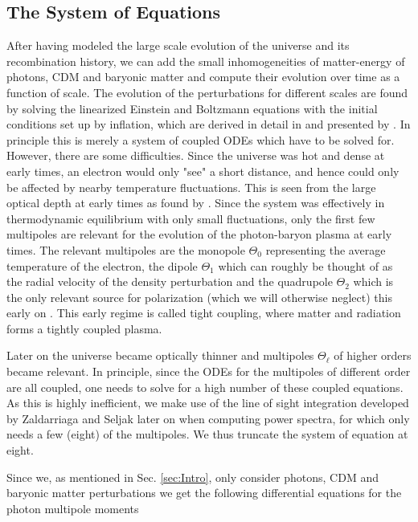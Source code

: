 \documentclass[twocolumn]{aastex62}
\begin{document}
\subsection{The System of Equations} \label{subsec:system}
After having modeled the large scale evolution of the universe and its recombination history, we can add the small inhomogeneities of matter-energy of photons, CDM and baryonic matter and compute their evolution over time as a function of scale. The evolution of the perturbations for different scales are found by solving the linearized Einstein and Boltzmann equations with the initial conditions set up by inflation, which are derived in detail in \cite{dodelson:2003} and presented by \cite{winther:2020b}. In principle this is merely a system of coupled ODEs which have to be solved for. However, there are some difficulties. Since the universe was hot and dense at early times, an electron would only "see" a short distance, and hence could only be affected by nearby temperature fluctuations. This is seen from the large optical depth at early times as found by \cite{stutzer:2020b}. Since the system was effectively in thermodynamic equilibrium with only small fluctuations, only the first few multipoles are relevant for the evolution of the photon-baryon plasma at early times. The relevant multipoles are the monopole $\Theta_0$ representing the average temperature of the electron, the dipole $\Theta_1$ which can roughly be thought of as the radial velocity of the density perturbation and the quadrupole $\Theta_2$ which is the only relevant source for polarization (which we will otherwise neglect) this early on \citep[]{winther:2020b}. This early regime is called tight coupling, where matter and radiation forms a tightly coupled plasma.

Later on the universe became optically thinner and multipoles $\Theta_\ell$ of higher orders became relevant. In principle, since the ODEs for the multipoles of different order are all coupled, one needs to solve for a high number of these coupled equations. As this is highly inefficient, we make use of the line of sight integration developed by Zaldarriaga and Seljak later on when computing power spectra, for which only needs a few (eight) of the multipoles. We thus truncate the system of equation at eight.

Since we, as mentioned in Sec. \ref{sec:Intro}, only consider photons, CDM and baryonic matter perturbations we get the following differential equations for the photon multipole moments
\end{document}
